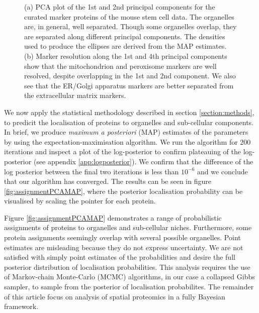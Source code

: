 \documentclass[12pt,english]{article}
\begin{document}
\begin{figure}[ht]
\begin{subfigure}[t]{0.5\textwidth}
        \caption{}
\end{subfigure}
  \centering
  \caption{ (a) PCA plot of the 1st and 2nd principal components for
    the curated marker proteins of the mouse stem cell data. The organelles
    are, in general, well separated. Though some organelles
    overlap, they are separated along different principal
    components. The densities used to produce the ellipses
    are derived from the MAP estimates. (b) Marker
    resolution along the 1st and 4th principal
    components show that the mitochondrion and peroxisome
    markers are well resolved, despite overlapping in the 1st and 2nd component.
    We also see that the ER/Golgi
        apparatus markers are better separated from the
    extracellular matrix markers.}
\label{figure::pcaellipse}
\end{figure}


\clearpage



We now apply the statistical methodology described in section \ref{section:methods},
to predicit the localisation of proteins to organelles and sub-cellular components.
In brief, we produce \textit{maximum a posteriori} (MAP) estimates of the parameters by using the expectation-maximisation
algorithm.
We run the algorithm for $200$ iterations and inspect a plot of the
log-posterior to confirm plateauing of the log-posterior (see appendix \ref{app:logposterior}). We confirm
that the difference of the log posterior between the final two iterations is less than $10^{-6}$
and we conclude that our algorithm has converged. The results can be seen in figure
\ref{fig:assignmentPCAMAP}, where the posterior localisation probability can be visualised by scaling the pointer
for each protein.

Figure \ref{fig:assignmentPCAMAP} demonstrates a range of probabilistic
assignments of proteins to organelles and sub-cellular niches. Furthermore, some protein assignments
seemingly overlap with several possible organelles. Point estimates are
misleading because they do not express uncertainty. We
are not satisfied with simply point estimates of the
probabilities and desire the full posterior distribution of localisation probabilities.
This analysis requires the use of Markov-chain Monte-Carlo (MCMC) algorithms, in our case a collapsed
Gibbs sampler, to sample from the posterior of localisation probabilites. The remainder of this
article focus on analysis of spatial proteomics in a fully Bayesian framework.
\end{document}
